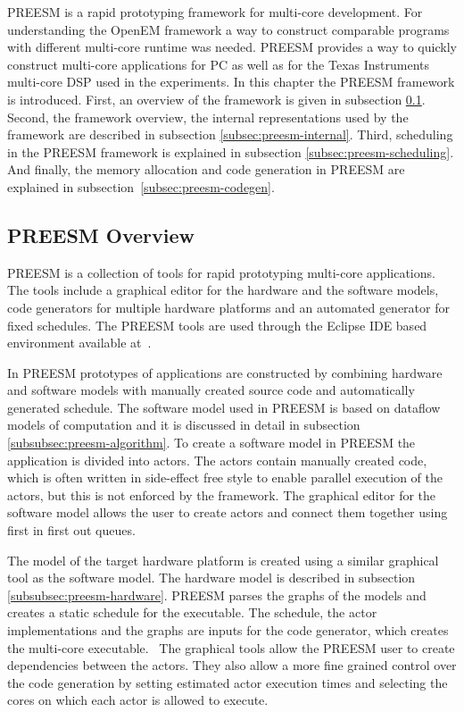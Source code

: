 PREESM is a rapid prototyping framework for multi-core development. For understanding the OpenEM framework a way to construct comparable programs with different multi-core runtime was needed. PREESM provides a way to quickly construct multi-core applications for PC as well as for the Texas Instruments multi-core DSP used in the experiments. In this chapter the PREESM framework is introduced. First, an overview of the framework is given in subsection \ref{subsec:preesm-overview}. Second, the framework overview, the internal representations used by the framework are described in subsection \ref{subsec:preesm-internal}. Third, scheduling in the PREESM framework is explained in subsection \ref{subsec:preesm-scheduling}. And finally, the memory allocation and code generation in PREESM are explained in subsection~\ref{subsec:preesm-codegen}.

\subsection{PREESM Overview}
\label{subsec:preesm-overview}
PREESM is a collection of tools for rapid prototyping multi-core applications. The tools include a graphical editor for the hardware and the software models, code generators for multiple hardware platforms and an automated generator for fixed schedules. The PREESM tools are used through the Eclipse IDE based environment available at~\cite{preesm}.

In PREESM prototypes of applications are constructed by combining hardware and software models with manually created source code and automatically generated schedule. The software model used in PREESM is based on dataflow models of computation and it is discussed in detail in subsection \ref{subsubsec:preesm-algorithm}. To create a software model in PREESM the application is divided into actors. The actors contain manually created code, which is often written in side-effect free style to enable parallel execution of the actors, but this is not enforced by the framework. The graphical editor for the software model allows the user to create actors and connect them together using first in first out queues.~\cite{preesm}

The model of the target hardware platform is created using a similar graphical tool as the software model. The hardware model is described in subsection \ref{subsubsec:preesm-hardware}. PREESM parses the graphs of the models and creates a static schedule for the executable. The schedule, the actor implementations and the graphs are inputs for the code generator, which creates the multi-core executable.~\cite{pelcat2014preesm} The graphical tools allow the PREESM user to create dependencies between the actors. They also allow a more fine grained control over the code generation by setting estimated actor execution times and selecting the cores on which each actor is allowed to execute.

